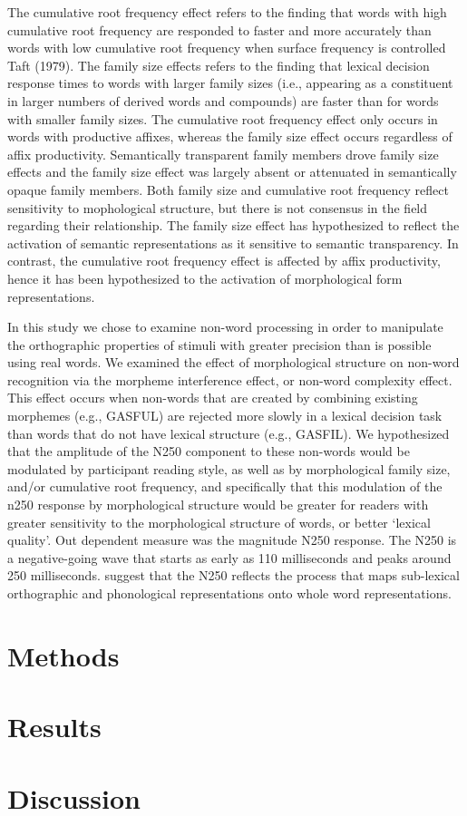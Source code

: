 \documentclass[review]{elsarticle}
\begin{document}
The cumulative root frequency effect refers to the finding that words with high cumulative root frequency are responded to faster and more accurately than words with low cumulative root frequency when surface frequency is controlled \citep{taftRecognitionAffixedWords1979}  Taft (1979).  The family size effects refers to the finding that  lexical decision response times to words with larger family sizes (i.e., appearing as a constituent in larger numbers of derived words and compounds) are faster than for words with smaller family sizes. The cumulative root frequency effect only occurs in words with productive affixes, whereas the family size effect occurs regardless of affix productivity. Semantically transparent family members drove family size effects and the family size effect was largely absent or attenuated in semantically opaque family members. Both family size and  cumulative root frequency reflect sensitivity to mophological structure, but  there is not consensus in the field regarding their relationship. 
The family size effect has hypothesized to reflect the activation of semantic representations as it sensitive to semantic transparency.  In contrast, the cumulative root frequency effect is affected by affix productivity, hence it has been hypothesized to the activation of morphological form representations.

In this study we chose to examine  non-word processing in order to manipulate the orthographic properties of stimuli with greater precision than is possible using real words.  We examined the effect of morphological structure on non-word recognition via the morpheme interference effect, or non-word complexity effect.  This effect occurs when non-words that are created by combining existing morphemes (e.g., GASFUL) are rejected more slowly in a lexical decision task than words that do not have lexical structure (e.g., GASFIL).  We hypothesized that the amplitude of the N250 component to  these non-words would be modulated by participant reading style, as well as by morphological family size, and/or cumulative root frequency, and specifically that  this modulation of the n250 response by morphological structure would be greater for readers with greater sensitivity to the morphological structure of words, or better `lexical quality'.  Out dependent measure was the magnitude N250 response.  The N250 is a negative-going wave that starts as early as 110 milliseconds and peaks around 250 milliseconds. {\renewcommand\&{and}\citet{holcombTimeCourseVisual2006}}  suggest that the N250 reflects the process that maps sub-lexical orthographic and phonological representations onto whole word representations.

\section{Methods}


\section{Results}



\section{Discussion}
	



\end{document}
